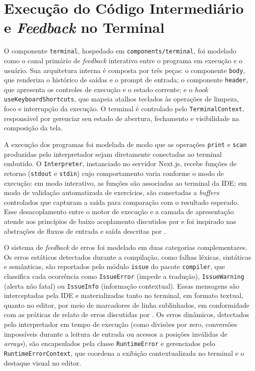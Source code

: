 \section{Execução do Código Intermediário e \textit{Feedback} no Terminal}
\label{sec:terminal-feedback}

O componente \texttt{terminal}, hospedado em \texttt{components/terminal}, foi modelado como o canal primário de \textit{feedback} interativo entre o programa em execução e o usuário. Sua arquitetura interna é composta por três peças: o componente \texttt{body}, que renderiza o histórico de saídas e o prompt de entrada; o componente \texttt{header}, que apresenta os controles de execução e o estado corrente; e o \textit{hook} \texttt{useKeyboardShortcuts}, que mapeia atalhos teclados às operações de limpeza, foco e interrupção da execução. O terminal é controlado pelo \texttt{TerminalContext}, responsável por gerenciar seu estado de abertura, fechamento e visibilidade na composição da tela.

A execução dos programas foi modelada de modo que as operações \texttt{print} e \texttt{scan} produzidas pelo interpretador sejam diretamente conectadas ao terminal embutido. O \texttt{Interpreter}, instanciado no servidor Next.js, recebe funções de retorno (\texttt{stdout} e \texttt{stdin}) cujo comportamento varia conforme o modo de execução: em modo interativo, as funções são associadas ao terminal da IDE; em modo de validação automatizada de exercícios, são conectadas a \textit{buffers} controlados que capturam a saída para comparação com o resultado esperado. Esse desacoplamento entre o motor de execução e a camada de apresentação atende aos princípios de baixo acoplamento discutidos por  e foi inspirado nas abstrações de fluxos de entrada e saída descritas por .

O sistema de \textit{feedback} de erros foi modelado em duas categorias complementares. Os erros estáticos detectados durante a compilação, como falhas léxicas, sintáticas e semânticas, são reportados pelo módulo \texttt{issue} do pacote \texttt{compiler}, que classifica cada ocorrência como \texttt{IssueError} (impede a tradução), \texttt{IssueWarning} (alerta não fatal) ou \texttt{IssueInfo} (informação contextual). Essas mensagens são interceptadas pela IDE e materializadas tanto no terminal, em formato textual, quanto no editor, por meio de marcadores de linha sublinhados, em conformidade com as práticas de relato de erros discutidas por . Os erros dinâmicos, detectados pelo interpretador em tempo de execução (como divisões por zero, conversões impossíveis durante a leitura de entrada ou acessos a posições inválidas de \textit{arrays}), são encapsulados pela classe \texttt{RuntimeError} e gerenciados pelo \texttt{RuntimeErrorContext}, que coordena a exibição contextualizada no terminal e o destaque visual no editor.

